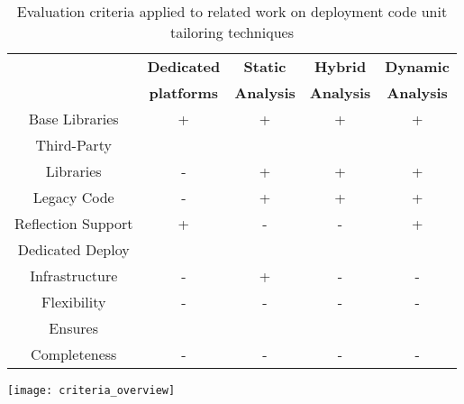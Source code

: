 \begin{table}[ht]
 \small
 	\centering
 	\begin{tabular}{ccccc}
	
\toprule
 			& \textbf{Dedicated}
 			& \textbf{Static}
			& \textbf{Hybrid}
 			& \textbf{Dynamic} \\
 			& \textbf{platforms}
 			& \textbf{Analysis}
			& \textbf{Analysis}
 			& \textbf{Analysis}\\
 \toprule

		Base Libraries
 			& + & + & + & +\\
		\hline
		Third-Party
		& & & & \\Libraries
 			& - & + & + & +\\
		\hline
		Legacy Code
 			& - & + & + & + \\
		\hline
		Reflection Support
 			& + & - & - & + \\
		\hline
		Dedicated Deploy
			& & & & \\
		Infrastructure
 			& - & + & - & -  \\
		\hline
		Flexibility
 			& - & - & - & -   \\
		\hline
		Ensures
		& & & & \\
		Completeness
 			& - & - & - & - \\
\bottomrule
 	\end{tabular}
	\texttt{[image: criteria\_overview]}
 	\caption{Evaluation criteria applied to related work on deployment code unit tailoring techniques}
 	\label{tb:comparison_intro}
 \end{table}

